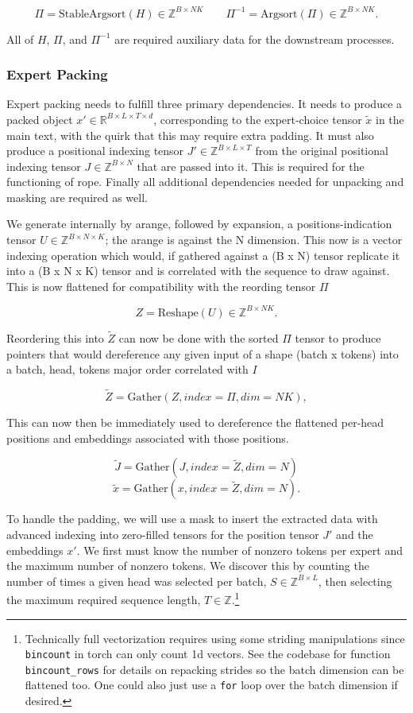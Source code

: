 \documentclass[11pt]{article}
\begin{document}
\[
\Pi = \mathrm{StableArgsort}(H) \in \mathbb{Z}^{B \times NK}
\qquad
\Pi^{-1} = \mathrm{Argsort}(\Pi) \in \mathbb{Z}^{B \times NK}.
\]

All of $H$, $\Pi$, and $\Pi^{-1}$ are required auxiliary data for the downstream processes.

\subsubsection{Expert Packing}

Expert packing needs to fulfill three primary dependencies. It needs to produce a packed object $x' \in \mathbb{R}^{B \times L \times T \times d}$, corresponding to the expert-choice tensor $\tilde{x}$ in the main text, with the quirk that this may require extra padding. It must also produce a positional indexing tensor $J' \in \mathbb{Z}^{B \times L \times T}$ from the original positional indexing tensor $J \in \mathbb{Z}^{B \times N}$ that are passed into it. This is required for the functioning of rope. Finally all additional dependencies needed for unpacking and masking are required as well.

We generate internally by arange, followed by expansion, a positions-indication tensor $U \in \mathbb{Z}^{B \times N \times K}$; the arange is against the N dimension. This now is a vector indexing operation which would, if gathered against a (B x N) tensor replicate it into a (B x N x K) tensor and is correlated with the sequence to draw against. This is now flattened for compatibility with the reording tensor $\Pi$

\[
Z = \mathrm{Reshape}(U) \in \mathbb{Z}^{B \times NK}.
\]

Reordering this into $\tilde{Z}$ can now be done with the sorted $\Pi$ tensor to produce pointers that would dereference any given input of a shape (batch x tokens) into a batch, head, tokens major order correlated with $I$

\[
\tilde{Z} = \mathrm{Gather}(Z, index=\Pi, dim=NK),
\]

This can now then be immediately used to dereference the flattened per-head positions and embeddings associated with those positions.

\[
\tilde{J} = \mathrm{Gather}(J, index=\tilde{Z}, dim = N)
\]
\[
\tilde{x} = \mathrm{Gather}(x, index=\tilde{Z}, dim=N).
\]

To handle the padding, we will use a mask to insert the extracted data with advanced indexing into zero-filled tensors for the position tensor $J'$ and the embeddings $x'$. We first must know the number of nonzero tokens per expert and the maximum number of nonzero tokens. We discover this by counting the number of times a given head was selected per batch, $S \in \mathbb{Z}^{B \times L}$, then selecting the maximum required sequence length, $T \in \mathbb{Z}$.\footnote{Technically full vectorization requires using some striding manipulations since \texttt{bincount} in torch can only count 1d vectors. See the codebase for function \texttt{bincount\_rows} for details on repacking strides so the batch dimension can be flattened too. One could also just use a \texttt{for} loop over the batch dimension if desired.}
\end{document}
